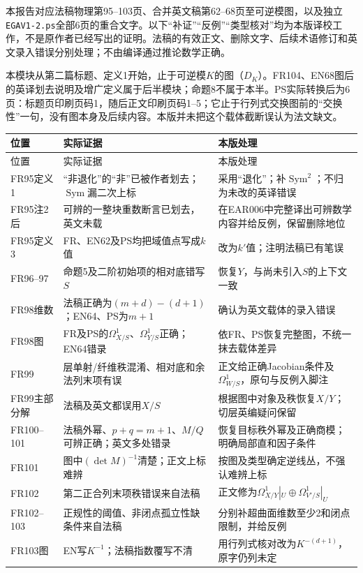 \begingroup
\def\Sym{\operatorname{Sym}}
\def\gr{\operatorname{gr}}
\providecommand{\Oa}{\mathcal O}
\providecommand{\Pp}{\mathcal P}
\providecommand{\Tt}{\mathcal T}
\noindent 本报告对应法稿物理第95--103页、合并英文稿第62--68页至可逆模图，以及独立\texttt{EGAV1-2.ps}全部6页的重合文字。以下“补证”“反例”“类型核对”均为本版译校工作，不是原作者已经写出的证明。法稿的有效正文、删除文字、后续术语修订和英文录入错误分别处理；不由编译通过推论数学正确。

本模块从第二篇标题、定义1开始，止于可逆模$K$的图（$D_K$）。FR104、EN68图后的英译划去说明及增广定义属于后半模块；命题8不属于本半。PS实际转换后为6页：标题页印刷页码1，随后正文印刷页码1--5；它止于行列式交换图前的“交换性”一句，没有图本身及后续内容。本版并未把这个载体截断误认为法文缺文。

\begin{longtable}{@{}p{}p{}p{}@{}}
\toprule
位置 & 实际证据 & 本版处理\\\midrule
\endfirsthead
\toprule 位置 & 实际证据 & 本版处理\\\midrule\endhead
FR95定义1 & “非退化”的“非”已被作者划去；$\Sym$漏二次上标 & 采用“退化”；补$\Sym^2$；不归为未改的英译错误\\
FR95注2后 & 可辨的一整块重数断言已划去，英文未载 & 在EAR006中完整译出可辨数学内容并给反例，保留删除地位\\
FR95定义3 & FR、EN62及PS均把域值点写成$k$值 & 改为$k'$值；注明法稿已有笔误\\
FR96--97 & 命题5及二阶初始项的相对底错写$S$ & 恢复$Y$，与尚未引入$S$的上下文一致\\
FR98维数 & 法稿正确为$(m+d)-(d+1)$；EN64、PS为$m+1$ & 确认为英文载体的录入错误\\
FR98图 & FR及PS的$\Omega_{X/S}^1$、$\Omega_{Y/S}^1$正确；EN64错录 & 依FR、PS恢复完整图，不统一抹去载体差异\\
FR99 & 层单射/纤维秩混淆、相对底和余法列末项有误 & 正文给正确Jacobian条件及$\Omega_{W/S}^1$，原句与反例入脚注\\
FR99主部分解 & 法稿及英文都误用$X/S$ & 根据图中对象及秩恢复$X/Y$；切层英编疑问保留\\
FR100--101 & 法稿外幂、$p+q=m+1$、$M/Q$可辨正确；英文多处错录 & 恢复目标秩外幂及正确商模；明确局部直和因子条件\\
FR101 & 图中$(\det M)^{-1}$清楚；正文上标难辨 & 按图及类型确定逆线丛，不强认难辨上标\\
FR102 & 第二正合列末项秩错误来自法稿 & 正文修为$\Omega_{X/Y}^1|_U\oplus\Omega_{V'/S}^1|_U$\\
FR102--103 & 正规性的阈值、非闭点孤立性缺条件来自法稿 & 分别补超曲面维数至少2和闭点限制，并给反例\\
FR103图 & EN写$K^{-1}$；法稿指数覆写不清 & 用行列式核对改为$K^{-(d+1)}$，原字仍列未定\\
\bottomrule
\end{longtable}

